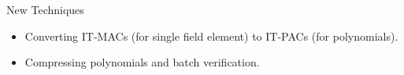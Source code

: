 \begin{frame}{New Techniques}
	\begin{itemize}
		\item Converting IT-MACs (for single field element) to IT-PACs (for polynomials).\pause
		\item Compressing polynomials and batch verification.
	\end{itemize}
\end{frame}